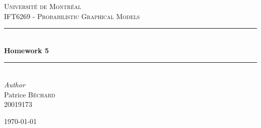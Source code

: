 \documentclass[11pt]{article}
\begin{document}
\begin{titlepage} %
	\newcommand{\HRule}{\rule{\linewidth}{0.5mm}} %
	
	\center %
	\vspace*{2cm}
	
	
	\textsc{\LARGE Universit\'e de Montr\'eal}\\[1cm] %
	\textsc{\Large IFT6269 - Probabilistic Graphical Models}\\[2cm] %
		
	
	\HRule\\[0.5cm]
	{\huge\bfseries Homework 5}\\[0.2cm] %
	\HRule\\[3cm]
	
	
	{\large\textit{Author}}\\
	 Patrice \textsc{B\'echard}\\ %
	 20019173
	
	
	\vfill\vfill\vfill %
	
	{\large\today} %
	
	
	 
	
	\vfill %
	
\end{titlepage}
\end{document}
